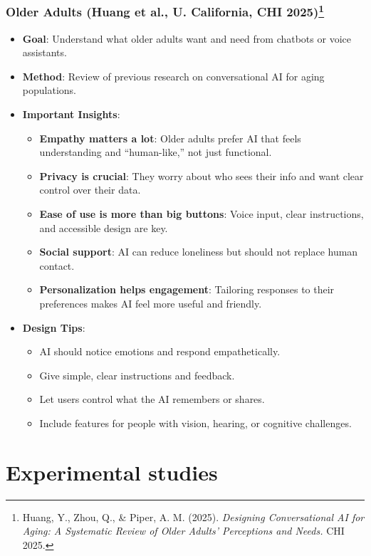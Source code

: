 \documentclass{beamer}
\begin{document}
\begin{frame}
    \frametitle{Older Adults (Huang et al., U. California, CHI 2025)\footnote{\tiny Huang, Y., Zhou, Q., \& Piper, A. M. (2025). \textit{Designing Conversational AI for Aging: A Systematic Review of Older Adults' Perceptions and Needs.} CHI 2025.}}
    \scriptsize
    \begin{itemize}
        \item \textbf{Goal}: Understand what older adults want and need from chatbots or voice assistants.
        \item \textbf{Method}: Review of previous research on conversational AI for aging populations.
        \item \textbf{Important Insights}:
        \begin{itemize}
            \scriptsize
            \item \textbf{Empathy matters a lot}: Older adults prefer AI that feels understanding and “human-like,” not just functional.
            \item \textbf{Privacy is crucial}: They worry about who sees their info and want clear control over their data.
            \item \textbf{Ease of use is more than big buttons}: Voice input, clear instructions, and accessible design are key.
            \item \textbf{Social support}: AI can reduce loneliness but should not replace human contact.
            \item \textbf{Personalization helps engagement}: Tailoring responses to their preferences makes AI feel more useful and friendly.
        \end{itemize}
        \item \textbf{Design Tips}:
        \begin{itemize}
            \scriptsize
            \item AI should notice emotions and respond empathetically.
            \item Give simple, clear instructions and feedback.
            \item Let users control what the AI remembers or shares.
            \item Include features for people with vision, hearing, or cognitive challenges.
        \end{itemize}
    \end{itemize}
\end{frame}

\section{Experimental studies}
\end{document}
